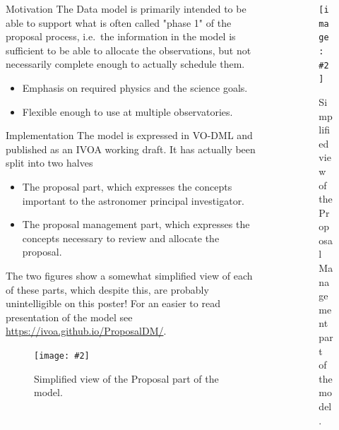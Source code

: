 \documentclass[final]{beamer}
\newlength{\sepwidth}
\newlength{\colwidth}
\newcommand{\separatorcolumn}{\begin{column}{\sepwidth}\end{column}}
\newcommand{\insertFigure}[3][width=1.0\textwidth]{%
    \begin{figure}[ht]
    \centering
    \texttt{[image: \#2]}
    \caption{#3}
    \label{fig:#2}
    \end{figure}
}
\begin{document}
\begin{frame}[t]
\begin{columns}[t]
\begin{column}{\colwidth}
\begin{block}{Motivation}
                    The Data model is primarily intended to be able to support what is often called "phase 1" of the proposal process, i.e.\ the information
                    in the model is sufficient to be able to allocate the observations, but not necessarily complete enough to actually schedule them.
                    \begin{itemize}
                        \item Emphasis on required physics and the science goals.
                        \item Flexible enough to use at multiple observatories.
                    \end{itemize}
                \end{block}
                \begin{block}{Implementation}
                     The model is expressed in VO-DML and published as an IVOA working draft. It has actually been split into two halves
                    \begin{itemize}
                        \item The proposal part, which expresses the concepts important to the astronomer principal investigator.
                        \item The proposal management part, which expresses the concepts necessary to review and allocate the proposal.
                    \end{itemize}
                    The two figures show a somewhat simplified view of each of these parts, which despite this, are probably unintelligible on
                    this poster!
                    For an easier to read presentation of the model see \href{https://ivoa.github.io/ProposalDM/}{https://ivoa.github.io/ProposalDM/}.
                \end{block}

                \insertFigure{proposaldm.vo-dml}{Simplified view of the Proposal part of the model.}

            \end{column}

            \separatorcolumn

            \begin{column}{\colwidth}



                \insertFigure{proposalManagement.vo-dml}{Simplified view of the Proposal Management part of the model.}



\end{column}
\end{columns}
\end{frame}
\end{document}
